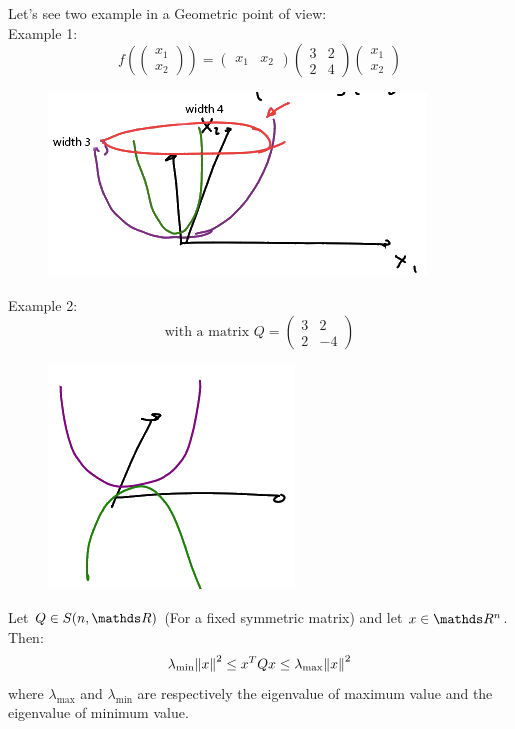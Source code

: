 \documentclass[ComputationalMathematics.tex]{subfiles}
\begin{document}
Let's see two example in a Geometric point of view:\\
Example 1:
$$ f(\begin{pmatrix} x_1\\ x_2 \end{pmatrix}) = \begin{pmatrix} x_1 & x_2 \end{pmatrix}
\begin{pmatrix} 3 & 2 \\ 2 & 4 \end{pmatrix}\begin{pmatrix} x_1\\ x_2 \end{pmatrix}
$$
\begin{figure}[H]
    \centering
    \includegraphics[scale = 0.45]{pics/26sett/quadratic_form_1.png}
\end{figure}

Example 2: 
$$\text{with a matrix } Q = \begin{pmatrix} 3 & 2 \\ 2 & -4 \end{pmatrix}$$
\begin{figure}[H]
    \centering
    \includegraphics[scale = 0.45]{pics/26sett/quadratic_form_2.png}
\end{figure}

\newpage
\begin{proposition}
  Let $Q \in S(n, \R)$ (For a fixed symmetric matrix) and let $x \in \R^n$. Then:
  $$\lambda_{\text{min}} {\left\lVert x\right\rVert}^2 \le {x}^{T}Qx \le \lambda_{\text{max}} {\left\lVert x\right\rVert}^2$$
  where $\lambda_{\text{max}}$ and $\lambda_{\text{min}}$ are respectively the eigenvalue of maximum value and the eigenvalue of minimum value.
\end{proposition}
\end{document}
